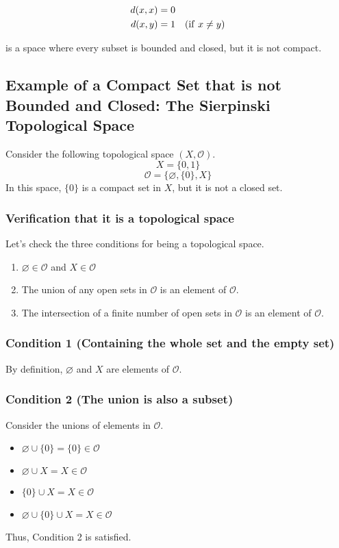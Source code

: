 \documentclass[article,letterpaper,12pt]{jsarticle}
\begin{document}
\begin{align*}
	d(x, x) & = 0                             \\
	d(x, y) & = 1 \ \ \ ({\rm if} \ x \neq y)
\end{align*}

is a space where every subset is bounded and closed, but it is not compact.


\subsection{Example of a Compact Set that is not Bounded and Closed: The Sierpinski Topological Space}

Consider the following topological space $(X, \mathcal{O})$.
$$X = \{0, 1\}$$
$$\mathcal{O} = \{\varnothing, \{0\}, X\}$$
In this space, $\{0\}$ is a compact set in $X$, but it is not a closed set.

\subsubsection{Verification that it is a topological space}

Let's check the three conditions for being a topological space.
\begin{enumerate}
	\item $\varnothing \in \mathcal{O}$ and $X \in \mathcal{O}$
	\item The union of any open sets in $\mathcal{O}$ is an element of $\mathcal{O}$.
	\item The intersection of a finite number of open sets in $\mathcal{O}$ is an element of $\mathcal{O}$.
\end{enumerate}

\subsubsection{Condition 1 (Containing the whole set and the empty set)}
By definition, $\varnothing$ and $X$ are elements of $\mathcal{O}$.

\subsubsection{Condition 2 (The union is also a subset)}
Consider the unions of elements in $\mathcal{O}$.
\begin{itemize}
	\item $\varnothing \cup \{0\} = \{0\} \in \mathcal{O}$
	\item $\varnothing \cup X = X \in \mathcal{O}$
	\item $\{0\} \cup X = X \in \mathcal{O}$
	\item $\varnothing \cup \{0\} \cup X = X \in \mathcal{O}$
\end{itemize}
Thus, Condition 2 is satisfied.
\end{document}
